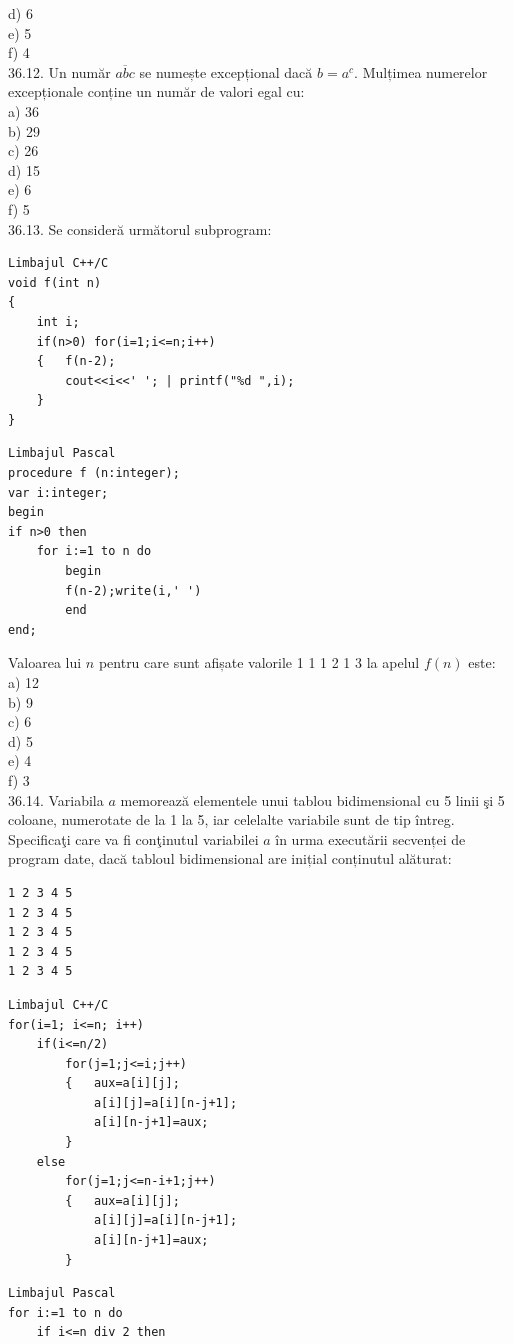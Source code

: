 \begin{itemize}
\begin{enumerate}
d) 6
\\
e) 5
\\
f) 4
\\
36.12. Un număr $\overline{a b c}$ se numește excepțional dacă $b=a^{c}$. Mulțimea numerelor excepționale conține un număr de valori egal cu:
\\
a) 36
\\
b) 29
\\
c) 26
\\
d) 15
\\
e) 6
\\
f) 5
\\
36.13. Se consideră următorul subprogram:
\begin{verbatim}
Limbajul C++/C
void f(int n)
{
    int i;
    if(n>0) for(i=1;i<=n;i++)
    {   f(n-2);
        cout<<i<<' '; | printf("%d ",i);
    }
}
\end{verbatim}
\begin{verbatim}
Limbajul Pascal
procedure f (n:integer);
var i:integer;
begin
if n>0 then
    for i:=1 to n do
        begin
        f(n-2);write(i,' ')
        end
end;
\end{verbatim}
Valoarea lui $n$ pentru care sunt afișate valorile 1 1 1 2 1 3 la apelul $f(n)$ este:
\\
a) 12
\\
b) 9
\\
c) 6
\\
d) 5
\\
e) 4
\\
f) 3
\\
36.14. Variabila $a$ memorează elementele unui tablou bidimensional cu 5 linii şi 5 coloane, numerotate de la 1 la 5, iar celelalte variabile sunt de tip întreg. Specificaţi care va fi conţinutul variabilei $a$ în urma executării secvenței de program date, dacă tabloul bidimensional are inițial conținutul alăturat:
\begin{verbatim}
1 2 3 4 5
1 2 3 4 5
1 2 3 4 5
1 2 3 4 5
1 2 3 4 5
\end{verbatim}
\begin{verbatim}
Limbajul C++/C
for(i=1; i<=n; i++)
    if(i<=n/2)
        for(j=1;j<=i;j++)
        {   aux=a[i][j];
            a[i][j]=a[i][n-j+1];
            a[i][n-j+1]=aux;
        }
    else
        for(j=1;j<=n-i+1;j++)
        {   aux=a[i][j];
            a[i][j]=a[i][n-j+1];
            a[i][n-j+1]=aux;
        }
\end{verbatim}
\begin{verbatim}
Limbajul Pascal
for i:=1 to n do
    if i<=n div 2 then

\end{verbatim}
\end{enumerate}
\end{itemize}
